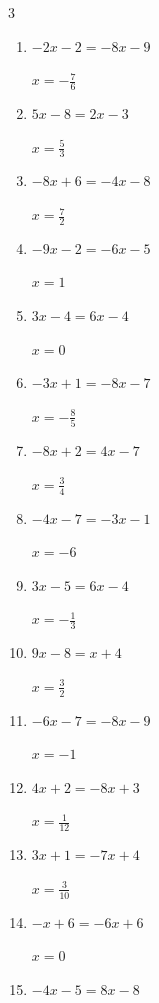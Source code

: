 \begin{multicols}{3}
\begin{enumerate}
  \item $-2x-2=-8x-9$

        $\displaystyle x=-\frac{7}{6}$

  \item $5x-8=2x-3$

        $\displaystyle x=\frac{5}{3}$

\columnbreak %

  \item $-8x+6=-4x-8$

        $\displaystyle x=\frac{7}{2}$

  \item $-9x-2=-6x-5$

        $\displaystyle x=1$

  \item $3x-4=6x-4$

        $\displaystyle x=0$

  \item $-3x+1=-8x-7$

        $\displaystyle x=-\frac{8}{5}$

  \item $-8x+2=4x-7$

        $\displaystyle x=\frac{3}{4}$

  \item $-4x-7=-3x-1$

        $\displaystyle x=-6$

  \item $3x-5=6x-4$

        $\displaystyle x=-\frac{1}{3}$

  \item $9x-8=x+4$

        $\displaystyle x=\frac{3}{2}$

  \item $-6x-7=-8x-9$

        $\displaystyle x=-1$

  \item $4x+2=-8x+3$

        $\displaystyle x=\frac{1}{12}$

  \item $3x+1=-7x+4$

        $\displaystyle x=\frac{3}{10}$

  \item $-x+6=-6x+6$

        $\displaystyle x=0$

  \item $-4x-5=8x-8$


\end{enumerate}
\end{multicols}
